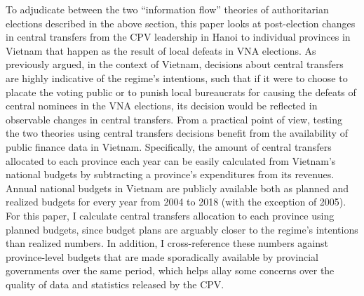\documentclass[12pt]{article}\usepackage[]{graphicx}\usepackage[]{color}
\newcommand{\1}{\mathbbm{1}}
\begin{document}
To adjudicate between the two ``information flow'' theories of authoritarian elections described in the above section, this paper looks at post-election changes in central transfers from the CPV leadership in Hanoi to individual provinces in Vietnam that happen as the result of local defeats in VNA elections. As previously argued, in the context of Vietnam, decisions about central transfers are highly indicative of the regime's intentions, such that if it were to choose to placate the voting public or to punish local bureaucrats for causing the defeats of central nominees in the VNA elections, its decision would be reflected in observable changes in central transfers. From a practical point of view, testing the two theories using central transfers decisions benefit from the availability of public finance data in Vietnam. Specifically, the amount of central transfers allocated to each province each year can be easily calculated from Vietnam's national budgets by subtracting a province's expenditures from its revenues. Annual national budgets in Vietnam are publicly available both as planned and realized budgets for every year from 2004 to 2018 (with the exception of 2005). For this paper, I calculate central transfers allocation to each province using planned budgets, since budget plans are arguably closer to the regime's intentions than realized numbers. In addition, I cross-reference these numbers against province-level budgets that are made sporadically available by provincial governments over the same period, which helps allay some concerns over the quality of data and statistics released by the CPV.
\end{document}
